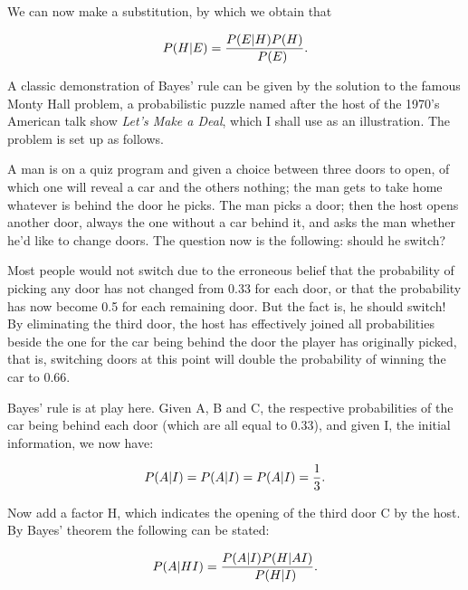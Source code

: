 We can now make a substitution, by which we obtain that

\begin{equation}
\\P(H|E) = \frac{\\P(E|H)\\P(H)}{\\P(E)}.
\end{equation}

A classic demonstration of Bayes' rule can be given by the solution to the
famous Monty Hall problem, a probabilistic puzzle named after the host of the
1970's American talk show \textit{Let's Make a Deal}, which I shall use as an
illustration. The problem is set up as follows.

A man is on a quiz program and given a choice between three doors to open, of
which one will reveal a car and the others nothing; the man gets to take home
whatever is behind the door he picks. The man picks a door; then the host opens
another door, always the one without a car behind it, and asks the man whether
he'd like to change doors. The question now is the following: should he switch?

Most people would not switch due to the erroneous belief that the probability
of picking any door has not changed from 0.33 for each door, or that the
probability has now become 0.5 for each remaining door. But the fact is, he
should switch! By eliminating the third door, the host has effectively joined
all probabilities beside the one for the car being behind the door the player
has originally picked, that is, switching doors at this point will double the
probability of winning the car to 0.66.

Bayes' rule is at play here. Given A, B and C, the respective probabilities of
the car being behind each door (which are all equal to 0.33), and given I, the
initial information, we now have:

\begin{equation}
 \\P(A|I) = \\P(A|I) = \\P(A|I) = \frac{1}{3}.
\end{equation}

Now add a factor H, which indicates the opening of the third door C by the
host. By Bayes' theorem the following can be stated:

\begin{equation}
  \\P(A|HI) = \frac{\\P(A|I) \\P(H|AI)}{\\P(H|I)}.
\end{equation}

